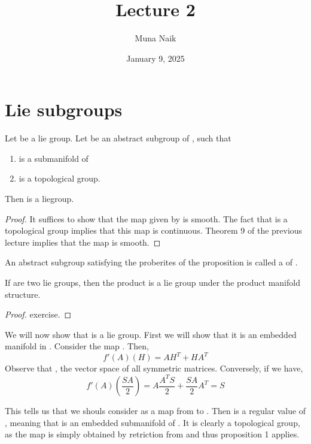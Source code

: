 \documentclass{article}
\title{Lecture 2}
\date{January 9, 2025}
\author{Muna Naik}
\newcommand*{\glrg}[1]{GL_{#1 \times #1}(\mathbb{R})}
\newcommand*{\org}[1]{O_{#1 \times #1}(\mathbb{R})}
\begin{document}
\maketitle

\section{Lie subgroups}

\begin{proposition}
    Let  be a lie group. Let  be an abstract subgroup of , such that 
    \begin{enumerate}
        \item {} is a submanifold of 
        \item {} is a topological group.
    \end{enumerate}
    Then  is a liegroup.
\end{proposition}

\begin{proof}
    It suffices to show that the \mm{\mu} map given by  is smooth.
    The fact that  is a topological group implies that this map is continuous.
    Theorem 9 of the previous lecture implies that the map is smooth.
\end{proof}

\begin{definition}
    An abstract subgroup satisfying the proberites of the proposition is called a  of .
\end{definition}

\begin{proposition}
    If  are two lie groups, then the product  is a lie group under the product manifold structure.
\end{proposition}

\begin{proof}
    exercise.
\end{proof}

We will now show that \mm{\org{n}} is a lie group. First we will show that it is an embedded manifold in \mm{\glrg{n}}. 
Consider the map . Then, $$f'(A)(H) = AH^T+HA^T$$
Observe that , the vector space of all symmetric matrices. Conversely, if  we have,
$$f'(A)(\frac{SA}{2}) = A\frac{A^TS}{2} + \frac{SA}{2}A^T = S$$

This tells us that we shouls consider  as a map from \mm{\glrg{n}} to . Then  is a regular value of , meaning 
that  is an embedded submanifold of \mm{\glrg{n}}. It is clearly a topological group, as the \mm{\mu} map is simply obtained by retriction
from \mm{\glrg{n}} and thus proposition 1 applies.
\end{document}
